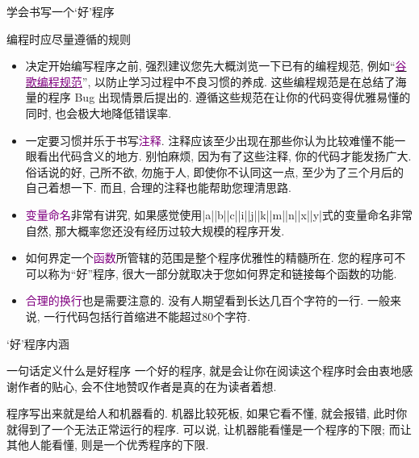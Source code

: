 \documentclass{beamer}
\newcommand{\purple}{\textcolor{purple}}
\begin{document}
    \begin{frame}[fragile]{学会书写一个`好'程序}
      \begin{block}{编程时应尽量遵循的规则}
        \begin{itemize}\small
          \item 决定开始编写程序之前, 强烈建议您先大概浏览一下已有的编程规范, 例如``\href{https://zh-google-styleguide.readthedocs.io/en/latest/google-cpp-styleguide/}{\purple{谷歌编程规范}}'', 以防止学习过程中不良习惯的养成. 这些编程规范是在总结了海量的程序 Bug 出现情景后提出的. 遵循这些规范在让你的代码变得优雅易懂的同时, 也会极大地降低错误率.
          \item 一定要习惯并乐于书写\purple{注释}. 注释应该至少出现在那些你认为比较难懂不能一眼看出代码含义的地方. 别怕麻烦, 因为有了这些注释, 你的代码才能发扬广大. 俗话说的好, 己所不欲, 勿施于人, 即使你不认同这一点, 至少为了三个月后的自己着想一下. 而且, 合理的注释也能帮助您理清思路.
          \item \purple{变量命名}非常有讲究, 如果感觉使用\cverb|a|\cverb|b|\cverb|c|\cverb|i|\cverb|j|\cverb|k|\cverb|m|\cverb|n|\cverb|x|\cverb|y|式的变量命名非常自然, 那大概率您还没有经历过较大规模的程序开发.
          \item 如何界定一个\purple{函数}所管辖的范围是整个程序优雅性的精髓所在. 您的程序可不可以称为``好''程序, 很大一部分就取决于您如何界定和链接每个函数的功能.
          \item \purple{合理的换行}也是需要注意的. 没有人期望看到长达几百个字符的一行. 一般来说, 一行代码包括行首缩进不能超过80个字符.
        \end{itemize}
      \end{block}
    \end{frame}

    \begin{frame}{`好'程序内涵}
      \begin{block}{一句话定义什么是好程序}
        一个好的程序, 就是会让你在阅读这个程序时会由衷地感谢作者的贴心, 会不住地赞叹作者是真的在为读者着想.
      \end{block}
      程序写出来就是给人和机器看的. 机器比较死板, 如果它看不懂, 就会报错, 此时你就得到了一个无法正常运行的程序. 可以说, 让机器能看懂是一个程序的下限; 而让其他人能看懂, 则是一个优秀程序的下限.
    \end{frame}
\end{document}
